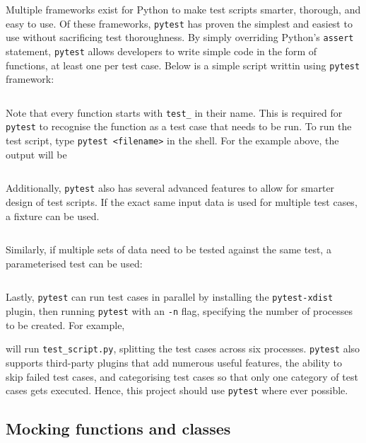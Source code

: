 \documentclass[11pt]{article}
\begin{document}
Multiple frameworks exist for Python to make test scripts smarter, thorough, and easy to use. Of these frameworks, \texttt{pytest} has proven the simplest and easiest to use without sacrificing test thoroughness. By simply overriding Python's \texttt{assert} statement, \texttt{pytest} allows developers to write simple code in the form of functions, at least one per test case. Below is a simple script writtin using \texttt{pytest} framework:

\inputminted{python}{python_examples/pytest_simple.py}

\noindent
Note that every function starts with \texttt{test_} in their name. This is required for \texttt{pytest} to recognise the function as a test case that needs to be run. To run the test script, type \texttt{pytest <filename>} in the shell. For the example above, the output will be 

\inputminted[linenos=false, frame=none]{shell}{python_examples/pytest_simple_output.txt}

Additionally, \texttt{pytest} also has several advanced features to allow for smarter design of test scripts. If the exact same input data is used for multiple test cases, a fixture can be used.

\inputminted{python}{python_examples/pytest_fixture.py}

\noindent
Similarly, if multiple sets of data need to be tested against the same test, a parameterised test can be used:

\inputminted{python}{python_examples/pytest_parameterize.py}

\noindent
Lastly, \texttt{pytest} can run test cases in parallel by installing the \texttt{pytest-xdist} plugin, then running \texttt{pytest} with an \texttt{-n} flag, specifying the number of processes to be created. For example,


\noindent
will run \texttt{test\_script.py}, splitting the test cases across six processes. \texttt{pytest} also supports third-party plugins that add numerous useful features, the ability to skip failed test cases, and categorising test cases so that only one category of test cases gets executed. Hence, this project should use \texttt{pytest} where ever possible.

\subsection{Mocking functions and classes}
\end{document}
